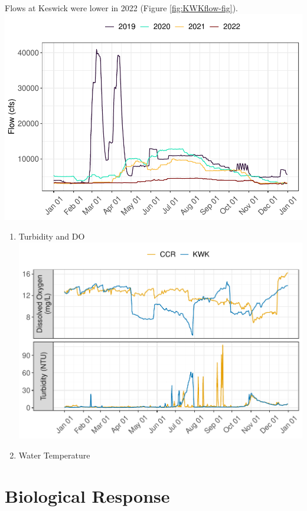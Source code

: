 \documentclass[
]{book}
\providecommand{\tightlist}{%
  \setlength{\itemsep}{0pt}\setlength{\parskip}{0pt}}
\theoremstyle{definition}
\theoremstyle{definition}
\theoremstyle{definition}
\theoremstyle{definition}
\theoremstyle{remark}
\begin{document}
Flows at Keswick were lower in 2022 (Figure \ref{fig:KWKflow-fig}).
\includegraphics{_main_files/figure-latex/KWKflow-fig-1.pdf}

\begin{enumerate}
\def\labelenumi{\arabic{enumi}.}
\setcounter{enumi}{3}
\tightlist
\item
  Turbidity and DO
  \includegraphics{_main_files/figure-latex/DOTurb-fig-1.pdf}
\item
  Water Temperature
\end{enumerate}

\hypertarget{biological-response-2}{%
\section{Biological Response}\label{biological-response-2}}
\end{document}
